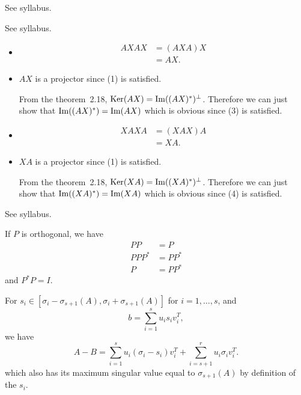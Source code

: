 \begin{solution}
  See syllabus.
\end{solution}

\begin{solution}
  See syllabus.
\end{solution}

\begin{solution}
  \begin{itemize}
    \item
      \begin{align*}
        AXAX
        & = (AXA)X\\
        & = AX.
      \end{align*}
    \item
      $AX$ is a projector since (1) is satisfied.

      From the theorem~2.18, $\operatorname{Ker}(AX) = \operatorname{Im}((AX)^*)^\perp$.
      Therefore we can just show that $\operatorname{Im}((AX)^*) = \operatorname{Im}(AX)$ which is obvious
      since (3) is satisfied.
    \item
      \begin{align*}
        XAXA
        & = (XAX)A\\
        & = XA.
      \end{align*}
    \item
      $XA$ is a projector since (1) is satisfied.

      From the theorem~2.18, $\operatorname{Ker}(XA) = \operatorname{Im}((XA)^*)^\perp$.
      Therefore we can just show that $\operatorname{Im}((XA)^*) = \operatorname{Im}(XA)$ which is obvious
      since (4) is satisfied.
  \end{itemize}
\end{solution}

\begin{solution}
  See syllabus.

  If $P$ is orthogonal, we have
  \begin{align*}
    PP & = P\\
    PPP^* & = PP^*\\
    P & = PP^*
  \end{align*}
  and $P^*P = I$.
\end{solution}

\nosolution

\nosolution

\begin{solution}
  For $s_i \in [\sigma_i - \sigma_{s+1}(A), \sigma_i + \sigma_{s+1}(A)]$ for $i = 1, \ldots, s$,
  and
  \[ b = \sum_{i=1}^s u_i s_i v_i^T, \]
  we have
  \[ A - B = \sum_{i=1}^s u_i(\sigma_i - s_i)v_i^T + \sum_{i=s+1}^r u_i\sigma_iv_i^T. \]
  which also has its maximum singular value equal to $\sigma_{s+1}(A)$ by definition of the $s_i$.
\end{solution}
